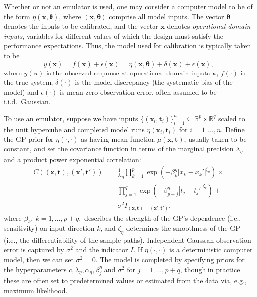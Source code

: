 \documentclass[twocolumn,10pt]{asme2ej}
\begin{document}
%
Whether or not an emulator is used, one may consider a computer model to be of the form $\eta(\mathbf x,\boldsymbol \theta)$, where $(\mathbf x,\boldsymbol \theta)$ comprise all model inputs. 
%
The vector $\boldsymbol \theta$ denotes the inputs to be calibrated, and the vector $\mathbf x$ denotes \emph{operational domain inputs}, variables for different values of which the design must satisfy the performance expectations.
%
%
%
Thus, the model used for calibration \cite{Kennedy2001} is typically taken to be
%
\begin{equation} \label{eq:model_gen}
y(\mathbf x)=f(\mathbf x)+\epsilon(\mathbf x) = \eta(\mathbf x,\boldsymbol \theta) + \delta(\mathbf x)+\epsilon(\mathbf x),
\end{equation} 
%
where $y(\mathbf x)$ is the observed response at operational domain inputs $\mathbf x$, $f(\cdot)$ is the true system, $\delta(\cdot)$ is the model discrepancy (the systematic bias of the model) and $\epsilon(\cdot)$ is mean-zero observation error, often assumed to be i.i.d.\ Gaussian. 
%

%
To use an emulator, suppose we have inputs $\{(\mathbf x_i,\mathbf t_i)\}_{i=1}^n\subseteq \mathbb R^p\times \mathbb R^q$ scaled to the 
unit hypercube and completed model runs 
%
$\eta\left(\mathbf x_i,\mathbf t_i\right)$ for $i=1,\ldots,n.$
%
Define the GP prior for $\eta(\cdot,\cdot)$ as having mean function $\mu(\mathbf x,\mathbf t)$, usually taken to be constant, and
%
set the covariance function in terms of the marginal precision $\lambda_\eta$ and a product power exponential correlation:
% 
\begin{equation}\label{eq:Hig_cov}
\begin{split}
C((\mathbf x,\mathbf t),(\mathbf x',\mathbf t')) = &\frac 1\lambda_\eta \prod_{k=1}^{p}
\exp \left(-\beta^\eta_k|x_k-x_k'|^{\zeta_\eta}\right) \times\\
& \prod_{j=1}^{q}
\exp \left(-\beta^\eta_{p+j}|t_j-t_j'|^{\zeta_\eta}\right) +\\
&\sigma^2 I_{(\mathbf x,\mathbf t)=(\mathbf x',\mathbf t')},
\end{split}
\end{equation}
%
where $\beta_k, ~k= 1, \ldots, p+q,$ describes the strength of the GP's dependence (i.e., sensitivity) on input direction $k$, and $\zeta_\eta$ determines the smoothness of the GP (i.e., the differentiability of the sample paths). 
%
Independent Gaussian observation error is captured by $\sigma^2$ and the indicator $I$.
%
If $\eta(\cdot,\cdot)$ is a deterministic computer model, then we can set $\sigma^2=0$.
%
The model is completed by specifying priors for the hyperparameters $c,\lambda_\eta,\alpha_\eta,\beta^\eta_j$ and $\sigma^2$ for $j=1,\ldots,p+q$, though in practice these are often set to predetermined values or estimated from the data via, e.g., maximum likelihood.
%
\end{document}
